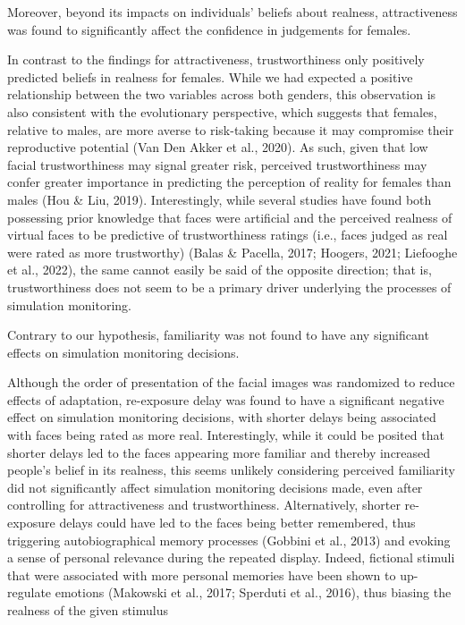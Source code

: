 \documentclass[
  man,floatsintext]{apa6}
\begin{document}
Moreover, beyond its impacts on individuals' beliefs about realness, attractiveness was found to significantly affect the confidence in judgements for females.

In contrast to the findings for attractiveness, trustworthiness only positively predicted beliefs in realness for females. While we had expected a positive relationship between the two variables across both genders, this observation is also consistent with the evolutionary perspective, which suggests that females, relative to males, are more averse to risk-taking because it may compromise their reproductive potential (Van Den Akker et al., 2020). As such, given that low facial trustworthiness may signal greater risk, perceived trustworthiness may confer greater importance in predicting the perception of reality for females than males (Hou \& Liu, 2019). Interestingly, while several studies have found both possessing prior knowledge that faces were artificial and the perceived realness of virtual faces to be predictive of trustworthiness ratings (i.e., faces judged as real were rated as more trustworthy) (Balas \& Pacella, 2017; Hoogers, 2021; Liefooghe et al., 2022), the same cannot easily be said of the opposite direction; that is, trustworthiness does not seem to be a primary driver underlying the processes of simulation monitoring.

Contrary to our hypothesis, familiarity was not found to have any significant effects on simulation monitoring decisions.

Although the order of presentation of the facial images was randomized to reduce effects of adaptation, re-exposure delay was found to have a significant negative effect on simulation monitoring decisions, with shorter delays being associated with faces being rated as more real. Interestingly, while it could be posited that shorter delays led to the faces appearing more familiar and thereby increased people's belief in its realness, this seems unlikely considering perceived familiarity did not significantly affect simulation monitoring decisions made, even after controlling for attractiveness and trustworthiness. Alternatively, shorter re-exposure delays could have led to the faces being better remembered, thus triggering autobiographical memory processes (Gobbini et al., 2013) and evoking a sense of personal relevance during the repeated display. Indeed, fictional stimuli that were associated with more personal memories have been shown to up-regulate emotions (Makowski et al., 2017; Sperduti et al., 2016), thus biasing the realness of the given stimulus
\end{document}
